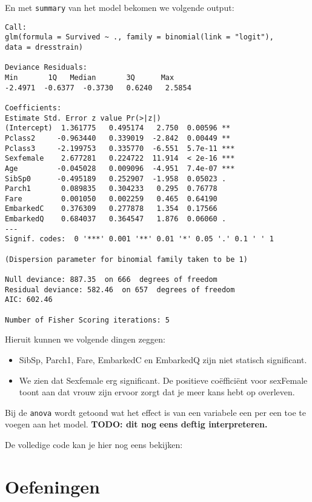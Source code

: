 En met \texttt{summary} van het model bekomen we volgende output:

\begin{lstlisting}
Call:
glm(formula = Survived ~ ., family = binomial(link = "logit"), 
data = dresstrain)

Deviance Residuals: 
Min       1Q   Median       3Q      Max  
-2.4971  -0.6377  -0.3730   0.6240   2.5854  

Coefficients:
Estimate Std. Error z value Pr(>|z|)    
(Intercept)  1.361775   0.495174   2.750  0.00596 ** 
Pclass2     -0.963440   0.339019  -2.842  0.00449 ** 
Pclass3     -2.199753   0.335770  -6.551  5.7e-11 ***
Sexfemale    2.677281   0.224722  11.914  < 2e-16 ***
Age         -0.045028   0.009096  -4.951  7.4e-07 ***
SibSp0      -0.495189   0.252907  -1.958  0.05023 .  
Parch1       0.089835   0.304233   0.295  0.76778    
Fare         0.001050   0.002259   0.465  0.64190    
EmbarkedC    0.376309   0.277878   1.354  0.17566    
EmbarkedQ    0.684037   0.364547   1.876  0.06060 .  
---
Signif. codes:  0 '***' 0.001 '**' 0.01 '*' 0.05 '.' 0.1 ' ' 1

(Dispersion parameter for binomial family taken to be 1)

Null deviance: 887.35  on 666  degrees of freedom
Residual deviance: 582.46  on 657  degrees of freedom
AIC: 602.46

Number of Fisher Scoring iterations: 5
\end{lstlisting}

Hieruit kunnen we volgende dingen zeggen:
\begin{itemize}
	\item SibSp, Parch1, Fare, EmbarkedC en EmbarkedQ zijn niet statisch significant. 
	\item We zien dat Sexfemale erg significant. De positieve co\"effici\"ent voor sexFemale toont aan dat vrouw zijn ervoor zorgt dat je meer kans hebt op overleven.  
\end{itemize}

Bij de \texttt{anova} wordt getoond wat het effect is van een variabele een per een toe te voegen aan het model. \textbf{TODO: dit nog eens deftig interpreteren.}


De volledige code kan je hier nog eens bekijken:


\section{Oefeningen}

